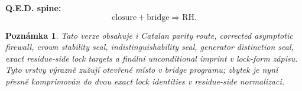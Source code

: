 \documentclass[11pt,a4paper]{article}
\newtheorem{remark}[theorem]{Poznámka}
\begin{document}
\bigskip

\noindent
\textbf{Q.E.D. spine:}
\[
\text{closure}+\text{bridge}\Longrightarrow \mathrm{RH}.
\]

\begin{remark}
Tato verze obsahuje i Catalan parity route, corrected asymptotic firewall, crown stability seal, indistinguishability seal, generator distinction seal, exact residue-side lock targets a finální unconditional imprint v lock-form zápisu.
Tyto vrstvy výrazně zužují otevřené místo v bridge programu; zbytek je nyní přesně komprimován do dvou exact lock identities v residue-side normalizaci.
\end{remark}
\end{document}
